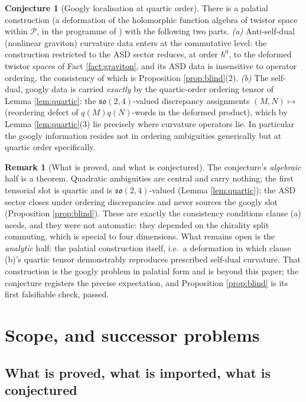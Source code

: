 \documentclass[11pt]{article}
\theoremstyle{definition}
\newtheorem{remark}[theorem]{Remark}
\newtheorem{conjecture}[theorem]{Conjecture}
\begin{document}
\begin{conjecture}[Googly localisation at quartic order]\label{conj:googly}
There is a palatial construction (a deformation of the holomorphic function algebra of twistor space within $\mathcal{P}$, in the programme of \cite{Penrose15}) with the following two parts. \emph{(a)} Anti-self-dual (nonlinear graviton) curvature data enters at the commutative level: the construction restricted to the ASD sector reduces, at order $\hbar^0$, to the deformed twistor spaces of Fact \ref{fact:graviton}, and its ASD data is insensitive to operator ordering, the consistency of which is Proposition \ref{prop:blind}(2). \emph{(b)} The self-dual, googly data is carried \emph{exactly} by the quartic-order ordering tensor of Lemma \ref{lem:quartic}: the $\mathfrak{so}(2,4)$-valued discrepancy assignments $(M, N) \mapsto$ (reordering defect of $q(M)q(N)$-words in the deformed product), which by Lemma \ref{lem:quartic}(3) lie precisely where curvature operators lie. In particular the googly information resides not in ordering ambiguities generically but at quartic order specifically.
\end{conjecture}

\begin{remark}[What is proved, and what is conjectured]\label{rem:googlyhonest}
The conjecture's \emph{algebraic} half is a theorem. Quadratic ambiguities are central and carry nothing; the first tensorial slot is quartic and is $\mathfrak{so}(2,4)$-valued (Lemma \ref{lem:quartic}); the ASD sector closes under ordering discrepancies and never sources the googly slot (Proposition \ref{prop:blind}). These are exactly the consistency conditions clause (a) needs, and they were not automatic: they depended on the chirality split commuting, which is special to four dimensions. What remains open is the \emph{analytic} half: the palatial construction itself, i.e.\ a deformation in which clause (b)'s quartic tensor demonstrably reproduces prescribed self-dual curvature. That construction is the googly problem in palatial form and is beyond this paper; the conjecture registers the precise expectation, and Proposition \ref{prop:blind} is its first falsifiable check, passed.
\end{remark}

\section{Scope, and successor problems}\label{sec:scope}

\subsection*{What is proved, what is imported, what is conjectured}
\end{document}
